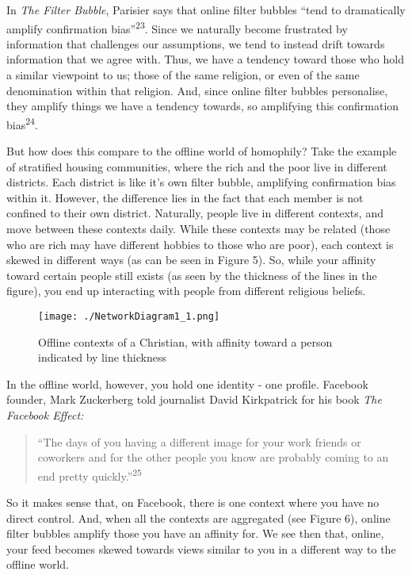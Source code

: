 \documentclass[]{article}
\begin{document}
In \emph{The Filter Bubble}, Parisier says that online filter bubbles
``tend to dramatically amplify confirmation bias''\textsuperscript{23}.
Since we naturally become frustrated by information that challenges our
assumptions, we tend to instead drift towards information that we agree
with. Thus, we have a tendency toward those who hold a similar viewpoint
to us; those of the same religion, or even of the same denomination
within that religion. And, since online filter bubbles personalise, they
amplify things we have a tendency towards, so amplifying this
confirmation bias\textsuperscript{24}.

But how does this compare to the offline world of homophily? Take the
example of stratified housing communities, where the rich and the poor
live in different districts. Each district is like it's own filter
bubble, amplifying confirmation bias within it. However, the difference
lies in the fact that each member is not confined to their own district.
Naturally, people live in different contexts, and move between these
contexts daily. While these contexts may be related (those who are rich
may have different hobbies to those who are poor), each context is
skewed in different ways (as can be seen in Figure 5). So, while your
affinity toward certain people still exists (as seen by the thickness of
the lines in the figure), you end up interacting with people from
different religious beliefs.

\begin{figure}
\centering
\texttt{[image: ./NetworkDiagram1\_1.png]}
\caption{Offline contexts of a Christian, with affinity toward a person
indicated by line thickness}
\end{figure}

In the offline world, however, you hold one identity - one profile.
Facebook founder, Mark Zuckerberg told journalist David Kirkpatrick for
his book \emph{The Facebook Effect:}

\begin{quote}
``The days of you having a different image for your work friends or
coworkers and for the other people you know are probably coming to an
end pretty quickly.''\textsuperscript{25}
\end{quote}

So it makes sense that, on Facebook, there is one context where you have
no direct control. And, when all the contexts are aggregated (see Figure
6), online filter bubbles amplify those you have an affinity for. We see
then that, online, your feed becomes skewed towards views similar to you
in a different way to the offline world.
\end{document}
